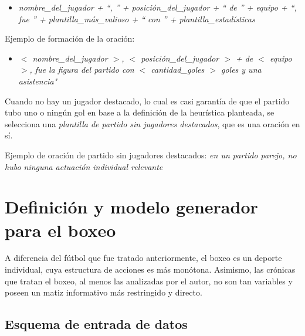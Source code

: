     \begin{itemize}
        \item \textit{nombre\_del\_jugador + “, ” + posición\_del\_jugador + “ de ” + equipo + “, fue ” + plantilla\_más\_valioso + “ con ” +  plantilla\_estadísticas}
    \end{itemize}

    Ejemplo de formación de la oración:

    \begin{itemize}
        \item \textit{$<$ nombre\_del\_jugador $>$, $<$ posición\_del\_jugador $>$ + de $<$ equipo $>$, fue la figura del partido con $<$ cantidad\_goles $>$ goles y una asistencia" }
    \end{itemize}

    Cuando no hay un jugador destacado, lo cual es casi garantía de que el partido tubo uno o ningún gol en base a la definición de la heurística planteada, se selecciona una 
    \textit{plantilla de partido sin jugadores destacados}, que es una oración en sí.

    Ejemplo de oración de partido sin jugadores destacados: \textit{en un partido parejo, no hubo ninguna actuación individual relevante}



    


\section{Definición y modelo generador para el boxeo}

    A diferencia del fútbol que fue tratado anteriormente, el boxeo es un deporte individual, cuya estructura de acciones es más monótona. Asimismo, 
las crónicas que tratan el boxeo, al menos las analizadas por el autor, no son tan variables y poseen un matiz informativo más restringido y directo. 

\subsection{Esquema de entrada de datos}

